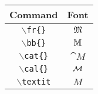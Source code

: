\documentclass[10pt]{article}
\begin{document}
\begin{center}
\begin{tabular}{|c|c|}
        \hline
        \end{tabular}
    \hspace{2cm}
    \begin{tabular}{|c|c|}
        \hline
        Command & Font \\
        \hline
        \texttt{$\backslash $fr\{\}} & $\mathfrak{M}$ \\
        \hline
        \texttt{$\backslash $bb\{\}} & $\mathbb{M}$ \\
        \hline
        \texttt{$\backslash $cat\{\}} & $\cat{M}$ \\
        \hline
        \texttt{$\backslash $cal\{\}} & $\cal{M}$ \\
        \hline
        \texttt{$\backslash $textit} & $\textit{M}$ \\
        \hline
    \end{tabular}
\end{center}

\hindex
\end{document}
